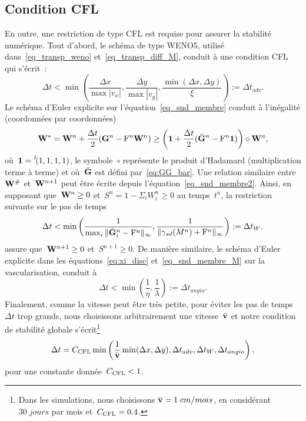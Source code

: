 \documentclass[main.tex]{subfiles}
\begin{document}
\subsection{Condition CFL}

En outre, une restriction de type CFL est requise pour assurer la stabilité numérique. Tout d'abord, le schéma de type WENO5, utilisé dans~\eqref{eq_transp_weno} et~\eqref{eq_transp_diff_M}, conduit à une condition CFL qui s'écrit~: 
\begin{equation}\label{eq:CFL-weno}
\Delta t < \min \left( \frac{\Delta x}{\max |v_x|} , \frac{\Delta y}{\max |v_y|}, \frac{\min(\Delta x , \Delta y )}{\xi}\right) := \Delta t_{adv}.
\end{equation}
Le schéma d'Euler explicite sur l'équation~\eqref{eq_snd_membre} conduit à l'inégalité 
(coordonnées par coordonnées)
$$
{\bf W}^{*}={\bf W}^n+\frac{\Delta t}{2} ({\bf G}^n -{\rm F}^n{\bf W}^n) \geq 
\left( \mathbf{1}+\frac{\Delta t}{2} (\bar{{\bf G}}^n - {\rm F}^n\mathbf{1} )\right) \circ {\bf W}^n,
$$
où~$\mathbf{1}=\prescript{\mathit{t\!}}{}{(1,1,1,1)}$, le symbole~$\circ$ représente le produit d'Hadamard (multiplication terme à terme) et où~$\bar{{\bf G}}$ est défini par~\eqref{eq:GG_bar}. 
Une relation similaire entre~${\bf W}^\#$ et~${\bf W}^{n+1}$ 
peut être écrite depuis l'équation~\eqref{eq_snd_membre2}. 
Ainsi, en supposant que~${\bf W}^n\geq 0$ et~$S^n=1-\Sigma_i W^n_i\geq 0$ 
au temps~$t^n$, la restriction suivante sur le pas de temps
\begin{equation}\label{eq:CFL-spliting-pop}
\Delta t < \min \left( \dfrac{1}{ \max_i \|  \bar{{\bf G}}_i^n-{\rm F}^n \|_\infty} , \dfrac{1}{ \| \gamma_{sd}(M^n) + {\rm F}^n  \|_{\infty}} \right) := \Delta t_{W}.
\end{equation}
assure que~${\bf W}^{n+1}\geq 0$ et~$S^{n+1}\geq 0$. 
De manière similaire, le schéma d'Euler explicite dans les équations~\eqref{eq:xi_disc} et~\eqref{eq_snd_membre_M} 
sur la vascularisation, conduit à
\begin{equation}\label{eq:CFL-spliting-vasc}
\Delta t < \min \left(  \frac{1}{\eta} , \frac{1}{\lambda}\right) := \Delta t_{angio}.
\end{equation}
Finalement, comme la vitesse peut être très petite, pour éviter les pas de temps 
$\Delta t$ trop grands, nous choisissons arbitrairement une vitesse~$\bar{\mathbf{v}}$ et notre condition de stabilité globale s'écrit\footnote{Dans les simulations, nous choisissons 
$\bar{\mathbf{v}}=1\;cm/mois$, en considérant~$30\;jours$ par mois et~$C_{{\mathrm{CFL}}}=0.4$.} 
\begin{equation}\label{eq:dt}
\Delta t =C_{{\mathrm{CFL}}}\min \left( \frac{1}{{\bar{\mathbf{v}}}} \min( \Delta x, \Delta y) , \Delta t_{adv}, \Delta t_{W} , \Delta t_{angio} \right),
\end{equation}
pour une constante donnée~$C_{{\mathrm{CFL}}}<1$.
\end{document}
